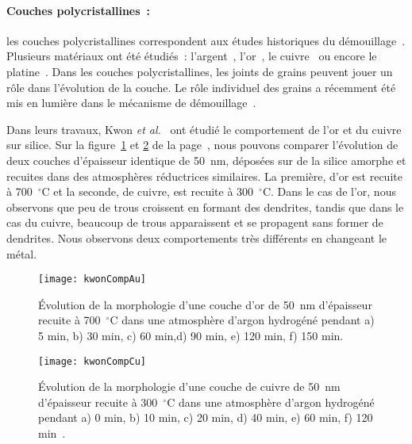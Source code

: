 \paragraph*{Couches polycristallines~:} les couches polycristallines correspondent aux études historiques du démouillage~\cite{presland1972hillock}. Plusieurs matériaux ont été étudiés~: l'argent~\cite{presland1972hillock, presland1972role, sharma1980agglomeration, sharma1980hillock, sharma1986hillock, dannenberg2000situ}, l'or~\cite{jiran1990capillary, kwon2003comparison, muller2010microstructure,jang2015crystallographic}, le cuivre~\cite{kwon2003comparison, gadkari2005comparison} ou encore le platine~\cite{gadkari2005comparison, atiya2014solid, jahangir2014situ}. Dans les couches
polycristallines, les joints de grains peuvent jouer un rôle dans l'évolution de la couche. Le rôle individuel des grains a récemment été mis en lumière dans le mécanisme de démouillage~\cite{atiya2014role, kosinova2014role}.\par 
Dans leurs travaux, Kwon\textit{ et al.}~\cite{kwon2003comparison} ont étudié le comportement de l'or et du cuivre sur silice. Sur la figure~\ref{kwonCompAu} et \ref{kwonCompCu} de la page~\pageref{kwonCompAu}, nous pouvons comparer l'évolution de deux couches d'épaisseur identique de 50~nm, déposées sur de la silice amorphe et recuites dans des atmosphères réductrices similaires. La première, d'or est recuite à 700~$^\circ$C et la seconde, de cuivre, est recuite à 300~$^\circ$C. Dans le cas de l'or, nous observons que peu de trous croissent en formant des dendrites, tandis que dans le cas du cuivre, beaucoup de trous apparaissent et se propagent sans former de dendrites. Nous observons deux comportements très différents en changeant le métal.\par 

\begin{figure}[!p]
\centering
\texttt{[image: kwonCompAu]}
\caption{Évolution de la morphologie d'une couche d'or de 50~nm d'épaisseur recuite à 700~$^\circ$C dans une atmosphère
d'argon hydrogéné pendant a) 5 min, b) 30 min, c) 60 min,d) 90 min, e) 120 min, f) 150 min.~\cite{kwon2003comparison}}
\label{kwonCompAu}
\end{figure}


\begin{figure}[!p]
\centering
\texttt{[image: kwonCompCu]}
\caption{Évolution de la morphologie d'une couche de cuivre de 50~nm d'épaisseur recuite à 300~$^\circ$C dans une atmosphère d'argon hydrogéné pendant a) 0 min, b) 10 min, c) 20 min, d) 40 min, e) 60 min, f) 120 min~\cite{kwon2003comparison}.}
\label{kwonCompCu}
\end{figure}



